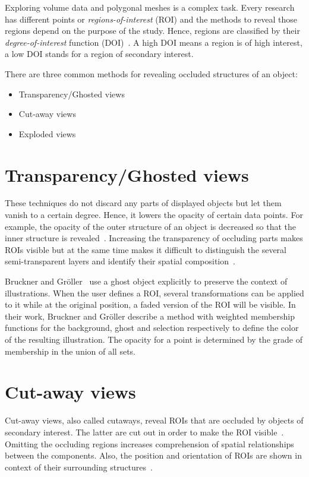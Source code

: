 
Exploring volume data and polygonal meshes is a complex task. Every research has different points or \emph{regions-of-interest} (ROI) and the methods to reveal those regions depend on the purpose of the study. Hence, regions are classified by their \emph{degree-of-interest} function (DOI)~\cite{proc:intelligentCutaway}. A high DOI means a region is of high interest, a low DOI stands for a region of secondary interest.

There are three common methods for revealing occluded structures of an object:
\begin{itemize}
	\item Transparency/Ghosted views
	\item Cut-away views
	\item Exploded views
\end{itemize}

\section{Transparency/Ghosted views}
These techniques do not discard any parts of displayed objects but let them vanish to a certain degree. Hence, it lowers the opacity of certain data points. For example, the opacity of the outer structure of an object is decreased so that the inner structure is revealed~\cite{jour:correa}. Increasing the transparency of occluding parts makes ROIs visible but at the same time makes it difficult to distinguish the several semi-transparent layers and identify their spatial composition~\cite{jour:interactiveCutaway}.

Bruckner and Gr{\"o}ller~\cite{proc:volumeshop} use a ghost object explicitly to preserve the context of illustrations. When the user defines a ROI, several transformations can be applied to it while at the original position, a faded version of the ROI will be visible. In their work, Bruckner and Gr{\"o}ller describe a method with weighted membership functions for the background, ghost and selection respectively to define the color of the resulting illustration. The opacity for a point is determined by the grade of membership in the union of all sets.

\section{Cut-away views}
Cut-away views, also called cutaways, reveal ROIs that are occluded by objects of secondary interest. The latter are cut out in order to make the ROI visible~\cite{proc:volumeshop}\cite{jour:adaptiveCutaways}\cite{jour:correa}\cite{incoll:cutawayIllustration}. Omitting the occluding regions increases comprehension of spatial relationships between the components. Also, the position and orientation of ROIs are shown in context of their surrounding structures~\cite{jour:interactiveCutaway}.

